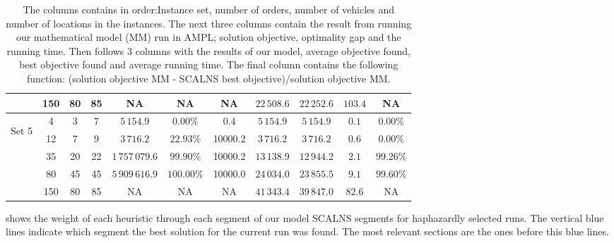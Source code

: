 \documentclass[../main.tex]{subfiles}
\begin{document}
\begin{table}
\begin{adjustbox}{width=0.95\columnwidth,center}
\begin{tabular}{|cccc|ccc|ccc|c|}
                        & 150     & 80    & 85    & NA              & NA            & NA        & $22\,508.6$   & $22\,252.6$   & $103.4$   & NA  \\
            \hline
                \multirow{5}{*}{\begin{sideways} Set 5 \end{sideways}}  
                        & 4       & 3     & 7     & $5\,154.9$      & $0.00\%$      & 0.4       & $5\,154.9$    & $5\,154.9$    & $0.1$     & $0.00\%$  \\
                        & 12      & 7     & 9     & $3\,716.2$      & $22.93\%$     & 10000.2   & $3\,716.2$    & $3\,716.2$    & $0.6$     & $0.00\%$  \\
                        & 35      & 20    & 22    & $1\,757\,079.6$ & $99.90\%$     & 10000.2   & $13\,138.9$   & $12\,944.2$   & $2.1$     & $99.26\%$  \\
                        & 80      & 45    & 45    & $5\,909\,616.9$ & $100.00\%$    & 10000.0   & $24\,034.0$   & $23\,855.5$   & $9.1$     & $99.60\%$  \\
                        & 150     & 80    & 85    & NA              & NA            & NA        & $41\,343.4$   & $39\,847.0$   & $82.6$    & NA  \\
            \hline
            \end{tabular}
    \end{adjustbox}
    \label{tab:finRes}
    \caption*{The columns contains in order:Instance set, number of orders, number of vehicles and number of locations in the instances. 
    The next three columns contain the result from running our mathematical model (MM) run in AMPL; solution objective, optimality gap and the running time.
    Then follows 3 columns with the results of our model, average objective found, best objective found and average running time. 
    The final column contains the following function: (solution objective MM - SCALNS best objective)/solution objective MM.}
\end{table}

 shows the weight of each heuristic through each segment of our model SCALNS segments for haphazardly selected runs. 
The vertical blue lines indicate which segment the best solution for the current run was found. The most relevant sections are the ones before this blue lines.
\end{document}

